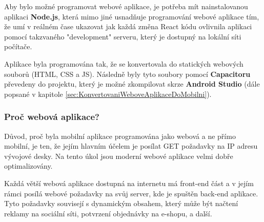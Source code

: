 Aby bylo možné programovat webové aplikace, je potřeba mít nainstalovanou aplikaci \textbf{Node.js}, která mimo jiné usnadňuje programování webové aplikace tím, že umí v reálném čase ukazovat jak každá změna React kódu ovlivnila aplikaci pomocí takzvaného "development" serveru, který je dostupný na lokální síti počítače.

Aplikace byla programována tak, že se konvertovala do statických webových souborů (HTML, CSS a JS). Následně byly tyto soubory pomocí \textbf{Capacitoru} převedeny do projektu, který je možné zkompilovat skrze \textbf{Android Studio} (dále popsané v kapitole \ref{sec:KonvertovaniWeboveAplikaceDoMobilni}).

%
%

\subsubsection{Proč webová aplikace?}\label{sec:ProcWebovaAplikace}
Důvod, proč byla mobilní aplikace programována jako webová a ne přímo mobilní, je ten, že jejím hlavním účelem je posílat GET požadavky na IP adresu vývojové desky. Na tento úkol jsou moderní webové aplikace velmi dobře optimalizovány.

Každá větší webová aplikace dostupná na internetu má front-end část a v jejím rámci posílá webové požadavky na svůj server, kde je spuštěn back-end aplikace. Tyto požadavky souvisejí s dynamickým obsahem, který může být načtení reklamy na sociální síti, potvrzení objednávky na e-shopu, a další.

